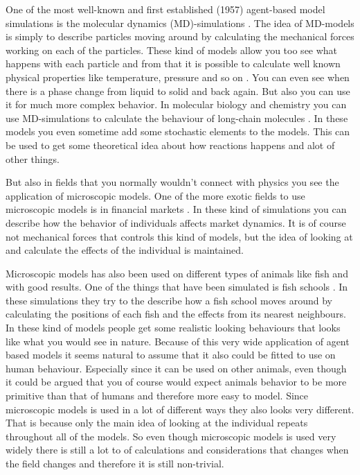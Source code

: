 One of the most well-known and first established (1957) 
agent-based model simulations is the molecular dynamics (MD)-simulations 
\cite{MDintro}. The idea of MD-models is simply to describe particles moving 
around by calculating the mechanical forces working on each of the particles.  
These kind of models allow you too see what happens with each particle and from 
that it is possible to calculate well known physical properties like 
temperature, pressure and so on . You can even see when there is a phase 
change from liquid to solid and back again. But also you can use it for much 
more complex behavior. In molecular biology and chemistry you can use 
MD-simulations to calculate the behaviour of long-chain molecules \cite{MDbio}.  
In these models you even sometime add some stochastic elements to the models.  
This can be used to get some theoretical idea about how reactions happens and 
alot of other things.

But also in fields that you normally wouldn't connect with physics you see the 
application of microscopic models.
One of the more exotic fields to use microscopic models is in financial 
markets \cite{finans}.  In these kind of simulations you can describe how the 
behavior of individuals affects market dynamics.  It is of course not 
mechanical forces that controls this kind of models, but the idea of looking 
at and calculate the effects of the individual is maintained. 

Microscopic models has also been used on different types of animals like fish 
and with good results.  One of the things that have been simulated is fish 
schools \cite{fish}. In these simulations they try to the describe how a fish 
school moves around by calculating the positions of each fish and the effects 
from its nearest neighbours. In these kind of models people get some realistic  
looking behaviours that looks like what you would see in nature. Because of 
this very wide application of agent based models it seems natural to assume 
that it also could be fitted to use on human behaviour. Especially since it can 
be used on other animals, even though it could be argued that you of course 
would expect animals behavior to be more primitive than that of humans and 
therefore more easy to model.  Since microscopic models is used in a lot of 
different ways they also looks very different. That is because only the main 
idea of looking at the individual repeats throughout all of the models. So even 
though microscopic models is used very widely there is still a lot to of 
calculations and considerations that changes when the field changes and 
therefore it is still non-trivial.

